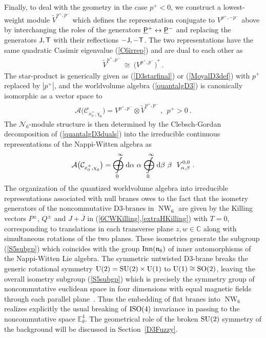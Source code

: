 \documentclass[11pt,a4paper]{article}
\DeclareMathOperator{\NW}{NW}
\newcommand{\mbf}[1]{{\boldsymbol {#1} }}
\def\dd{{\rm d}}
\def\T{{\sf T}}
\def\J{{\sf J}}
\def\Pu{\underline{\sf P}{}}
\newcommand{\complex}{{\mathbb C}} %
\newcommand{\eucl}{{\mathbb E}}
\newcommand{\beq}{\begin{eqnarray}}
\newcommand{\eeq}{\end{eqnarray}}
\begin{document}
Finally, to deal with the geometry in the case $p^+<0$, we construct a
lowest-weight module $\widetilde{V}^{p^+,p^-}$ which defines the
representation conjugate to $V^{p^+,-p^-}$ above by interchanging the
roles of the generators $\Pu^+\leftrightarrow\Pu^-$ and replacing the
generators $\J,\T$ with their reflections $-\J,-\T$. The two
representations have the same quadratic Casimir
eigenvalue (\ref{C6irrep}) and are dual to each other as
\beq
\widetilde{V}^{p^+,p^-}~\cong~\bigl(V^{p^+,p^-}\bigr)^* \ .
\label{dualreps}\eeq
The star-product is generically given as (\ref{D3starfinal}) or
(\ref{MoyalD3def}) with $p^+$ replaced by $|p^+|$, and the worldvolume
algebra (\ref{quantalgD3}) is canonically isomorphic as a vector space
to
\beq
\mathcal{A}\bigl(\mathcal{C}_{x_0^+,\chi^{~}_0}\bigr)=V^{p^+,p^-}
\otimes\widetilde{V}^{p^+,p^-} \ , ~~ p^+>0 \ .
\label{quantalgD3duals}\eeq
The $\mathcal{N}_6$-module structure is then determined by the
Clebsch-Gordan decomposition of (\ref{quantalgD3duals}) into the
irreducible continuous representations of the Nappi-Witten algebra as
\beq
\mathcal{A}\bigl(\mathcal{C}_{x_0^+,\chi^{~}_0}\bigr)=~{\int\limits_0^\infty
\!\!\!\!\!\!\!\!\!\!\!\!~\,\bigodot\!\!\!\!\!\!\!\!\!\!\mbf-\!\!
\mbf-}~\dd\alpha~\alpha~~{\int\limits_0^\infty
\!\!\!\!\!\!\!\!\!\!\!\!~\,\bigodot\!\!\!\!\!\!\!\!\!\!\mbf-\!\!
\mbf-}~\dd\beta~\beta~~V_{\alpha,\beta}^{0,0} \ .
\label{D3module}\eeq
The organization of the quantized worldvolume algebra into irreducible
representations associated with null branes owes to the fact that
the isometry generators of the noncommutative D3-branes in $\NW_6$ are
given by the Killing vectors $P^\pm$, $Q^\pm$ and $J+\overline{J}$ in
(\ref{6CWKilling},\ref{extraHKilling}) with $T=0$, corresponding to
translations in each transverse plane $z,w\in\complex$ along with
simultaneous rotations of the two planes. These isometries generate
the subgroup (\ref{S5subgp}) which coincides with the group ${\rm
Inn}(\mathfrak{n}_6)$ of inner automorphisms of the Nappi-Witten Lie algebra.
The symmetric untwisted D3-brane breaks the generic rotational symmetry ${\rm
U}(2)={\rm SU}(2)\times{\rm U}(1)$ to ${\rm U}(1)\cong{\rm SO}(2)$, leaving the
overall isometry subgroup (\ref{S5subgp}) which is precisely the symmetry group
of noncommutative euclidean space in four dimensions with equal magnetic fields
through each parallel plane~\cite{AlVaz1,CMNTV1}. Thus the embedding
of flat branes into $\NW_6$ realizes explicitly the usual breaking of
${\rm ISO}(4)$ invariance in passing to the noncommutative space
$\eucl_\theta^4$. The geometrical role of the broken ${\rm SU}(2)$
symmetry of the background will be discussed in
Section~\ref{D3Fuzzy}.
\end{document}

